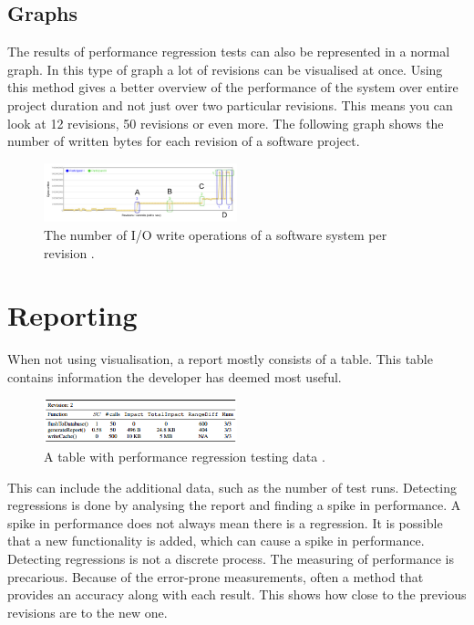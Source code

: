 \subsection{Graphs}
The results of performance regression tests can also be represented in a normal graph. In this type of graph a lot of revisions can be visualised at once. Using this method gives a better overview of the performance of the system over entire project duration and not just over two particular revisions. This means you can look at 12 revisions, 50 revisions or even more. The following graph shows the number of written bytes for each revision of a software project.

\begin{figure}[h]
\begin{center}
  \includegraphics[width=0.5\textwidth]{Figures/bytegraph.png}
\end{center}
  \caption{The number of I/O write operations of a software system per revision \cite{bezemer2014detecting}.}

\end{figure}


\section{Reporting}
When not using visualisation, a report mostly consists of a table. This table contains information the developer has deemed most useful.
\begin{figure}[h]
\begin{center}
  \includegraphics[width=0.5\textwidth]{Figures/table.png}
\end{center}
  \caption{A table with performance regression testing data \cite{bezemer2014detecting}.}

\end{figure}

 This can include the additional data, such as the number of test runs. Detecting regressions is done by analysing the report and finding a spike in performance. A spike in performance does not always mean there is a regression. It is possible that a new functionality is added, which can cause a spike in performance. Detecting regressions is not a discrete process. The measuring of performance is precarious. Because of the error-prone measurements, often a method that provides an accuracy along with each result. This shows how close to the previous revisions are to the new one.\\ \\


